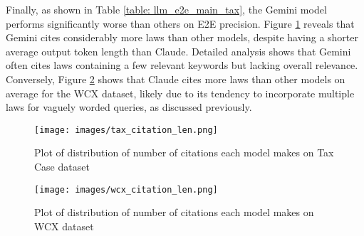 Finally, as shown in Table \ref{table: llm_e2e_main_tax}, the Gemini model performs significantly worse than others on E2E precision. Figure \ref{fig: tax_citation_len} reveals that Gemini cites considerably more laws than other models, despite having a shorter average output token length than Claude. Detailed analysis shows that Gemini often cites laws containing a few relevant keywords but lacking overall relevance. Conversely, Figure \ref{fig: wcx_citation_len} shows that Claude cites more laws than other models on average for the WCX dataset, likely due to its tendency to incorporate multiple laws for vaguely worded queries, as discussed previously.

\begin{figure}[ht]
\centering
\texttt{[image: images/tax\_citation\_len.png]}
\caption{Plot of distribution of number of citations each model makes on Tax Case dataset}
\label{fig: tax_citation_len}
\end{figure}

\begin{figure}[ht]
\centering
\texttt{[image: images/wcx\_citation\_len.png]}
\caption{Plot of distribution of number of citations each model makes on WCX dataset}
\label{fig: wcx_citation_len}
\end{figure}






